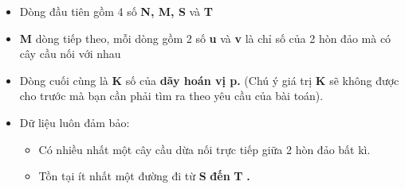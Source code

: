 \begin{itemize}
	\item Dòng đầu tiên gồm 4 số \textbf{ N, M, S } và \textbf{ T }
	\item \textbf{M } dòng tiếp theo, mỗi dòng gồm 2 số \textbf{ u } và \textbf{ v } là chỉ số của 2 hòn đảo mà có cây cầu nối với nhau
	\item Dòng cuối cùng là \textbf{ K } số của \textbf{ dãy hoán vị p. } (Chú ý giá trị \textbf{ K } sẽ không được cho trước mà bạn cần phải tìm ra theo yêu cầu của bài toán).
	\item Dữ liệu luôn đảm bảo:
\begin{itemize}
	\item Có nhiều nhất một cây cầu dừa nối trực tiếp giữa 2 hòn đảo bất kì.
	\item Tồn tại ít nhất một đường đi từ \textbf{ S }\textbf{ đến }\textbf{ T }\textbf{ . }
\end{itemize}
\end{itemize}